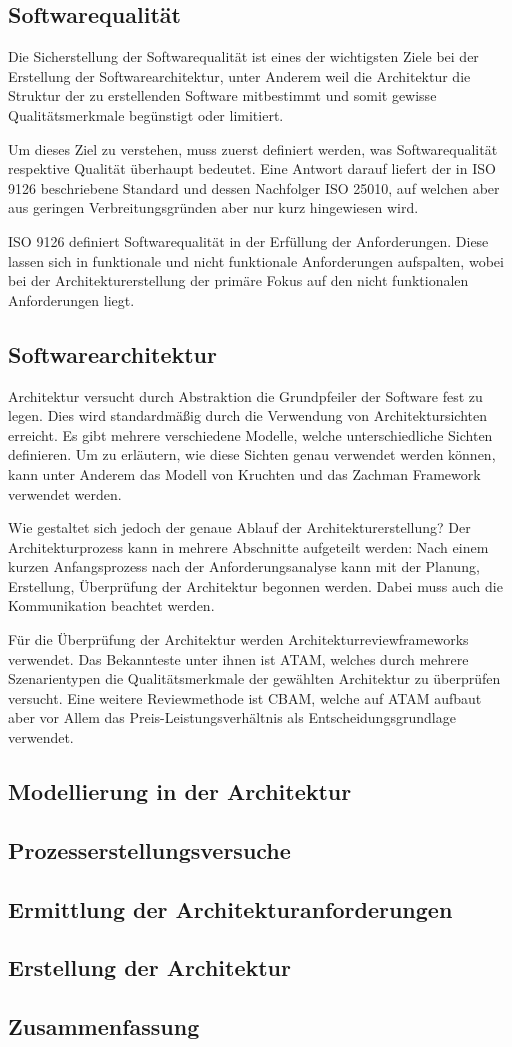 \subsection{Softwarequalität}
Die Sicherstellung der Softwarequalität ist eines der wichtigsten Ziele bei der Erstellung der Softwarearchitektur, unter Anderem weil die Architektur die Struktur der zu erstellenden Software mitbestimmt und somit gewisse Qualitätsmerkmale begünstigt oder limitiert.

Um dieses Ziel zu verstehen, muss zuerst definiert werden, was Softwarequalität respektive Qualität überhaupt bedeutet. Eine Antwort darauf liefert der in ISO 9126 beschriebene Standard und dessen Nachfolger ISO 25010, auf welchen aber aus geringen Verbreitungsgründen aber nur kurz hingewiesen wird.

ISO 9126 definiert Softwarequalität in der Erfüllung der Anforderungen. Diese lassen sich in funktionale und nicht funktionale Anforderungen aufspalten, wobei bei der Architekturerstellung der primäre Fokus auf den nicht funktionalen Anforderungen liegt.

\subsection{Softwarearchitektur}
Architektur versucht durch Abstraktion die Grundpfeiler der Software fest zu legen. Dies wird standardmäßig durch die Verwendung von Architektursichten erreicht. Es gibt mehrere verschiedene Modelle, welche unterschiedliche Sichten definieren. Um zu erläutern, wie diese Sichten genau verwendet werden können, kann unter Anderem das Modell von Kruchten und das Zachman Framework verwendet werden.

Wie gestaltet sich jedoch der genaue Ablauf der Architekturerstellung? Der Architekturprozess kann in mehrere Abschnitte aufgeteilt werden: Nach einem kurzen Anfangsprozess nach der Anforderungsanalyse kann mit der Planung, Erstellung, Überprüfung der Architektur begonnen werden. Dabei muss auch die Kommunikation beachtet werden.

Für die Überprüfung der Architektur werden Architekturreviewframeworks verwendet. Das Bekannteste unter ihnen ist ATAM, welches durch mehrere Szenarientypen die Qualitätsmerkmale der gewählten Architektur zu überprüfen versucht. Eine weitere Reviewmethode ist CBAM, welche auf ATAM aufbaut aber vor Allem das Preis-Leistungsverhältnis als Entscheidungsgrundlage verwendet.

\subsection{Modellierung in der Architektur}
\subsection{Prozesserstellungsversuche}
\subsection{Ermittlung der Architekturanforderungen}
\subsection{Erstellung der Architektur}
\subsection{Zusammenfassung}